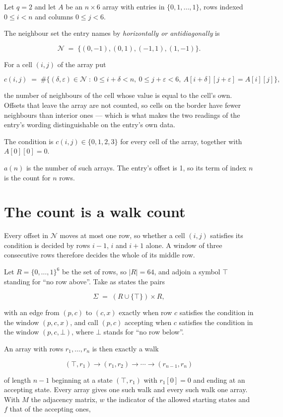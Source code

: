 \documentclass[11pt]{article}
\theoremstyle{definition}
\begin{document}
Let $q = 2$ and let $A$ be an $n \times 6$ array with entries in $\{0,1,\dots,1\}$, rows indexed $0 \le i < n$ and columns $0 \le j < 6$.

The neighbour set the entry names by {\itshape horizontally or antidiagonally} is

\[\mathcal{N} \;=\; \{(0,-1), (0,1), (-1,1), (1,-1)\}.\]

For a cell $(i,j)$ of the array put

\[c(i,j) \;=\; \#\bigl\{(\delta,\varepsilon)\in\mathcal{N} \;:\; 0\le i+\delta<n,\ 0\le j+\varepsilon<6,\ A[i+\delta][j+\varepsilon] = A[i][j]\bigr\},\]

the number of neighbours of the cell whose value is equal to the cell's own. Offsets that leave the array are not counted, so cells on the border have fewer neighbours than interior ones --- which is what makes the two readings of the entry's wording distinguishable on the entry's own data.

The condition is $c(i,j) \in \{0, 1, 2, 3\}$ for every cell of the array, together with $A[0][0]=0$.

$a(n)$ is the number of such arrays. The entry's offset is 1, so its term of index $n$ is the count for $n$ rows.

\section{The count is a walk count}

Every offset in $\mathcal{N}$ moves at most one row, so whether a cell $(i,j)$ satisfies its condition is decided by rows $i-1$, $i$ and $i+1$ alone. A window of three consecutive rows therefore decides the whole of its middle row.

Let $R = \{0,\dots,1\}^{6}$ be the set of rows, so $|R| = 64$, and adjoin a symbol $\top$ standing for ``no row above''. Take as states the pairs

\[\Sigma \;=\; (R \cup \{\top\}) \times R,\]

with an edge from $(p,c)$ to $(c,x)$ exactly when row $c$ satisfies the condition in the window $(p,c,x)$, and call $(p,c)$ accepting when $c$ satisfies the condition in the window $(p,c,\bot)$, where $\bot$ stands for ``no row below''.

An array with rows $r_1,\dots,r_n$ is then exactly a walk

\[(\top,r_1) \to (r_1,r_2) \to \cdots \to (r_{n-1},r_n)\]

of length $n-1$ beginning at a state $(\top,r_1)$ with $r_1[0]=0$ and ending at an accepting state. Every array gives one such walk and every such walk one array. With $M$ the adjacency matrix, $w$ the indicator of the allowed starting states and $f$ that of the accepting ones,
\end{document}

